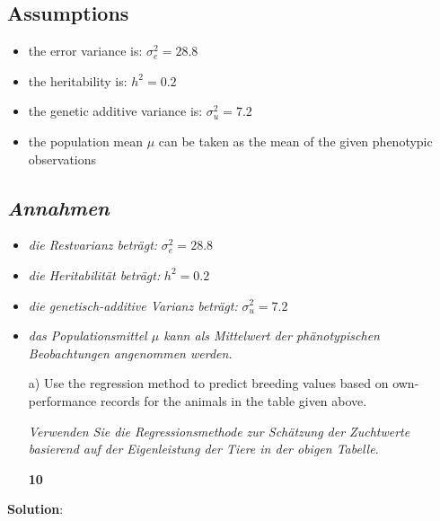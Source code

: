 \documentclass[
]{article}
\providecommand{\tightlist}{%
  \setlength{\itemsep}{0pt}\setlength{\parskip}{0pt}}
\newcommand{\points}[1]
{\begin{flushright}\textbf{#1}\end{flushright}}
\newcommand{\solstart}
{\vspace{3ex}\textbf{Solution}:}
\begin{document}
\hypertarget{assumptions}{%
\subsection{Assumptions}\label{assumptions}}

\begin{itemize}
\tightlist
\item
  the error variance is: \(\sigma_e^2 = 28.8\)
\item
  the heritability is: \(h^2 = 0.2\)
\item
  the genetic additive variance is: \(\sigma_u^2 = 7.2\)
\item
  the population mean \(\mu\) can be taken as the mean of the given
  phenotypic observations
\end{itemize}

\hypertarget{section}{%
\subsection{\texorpdfstring{\textit{Annahmen}}{}}\label{section}}

\begin{itemize}
\tightlist
\item
  \textit{die Restvarianz beträgt:} \(\sigma_e^2 = 28.8\)
\item
  \textit{die Heritabilität beträgt:} \(h^2 = 0.2\)
\item
  \textit{die genetisch-additive Varianz beträgt:} \(\sigma_u^2 = 7.2\)
\item
  \textit{das Populationsmittel $\mu$ kann als Mittelwert der phänotypischen Beobachtungen angenommen werden.}
\end{itemize}

\vspace{3ex}
\begin{enumerate}
\item[a)] Use the regression method to predict breeding values based on own-performance records for the animals in the table given above.

\textit{Verwenden Sie die Regressionsmethode zur Schätzung der Zuchtwerte basierend auf der Eigenleistung der Tiere in der obigen Tabelle.}
\points{10}
\end{enumerate}

\clearpage
\pagebreak

\solstart

\clearpage
\pagebreak
\end{document}
